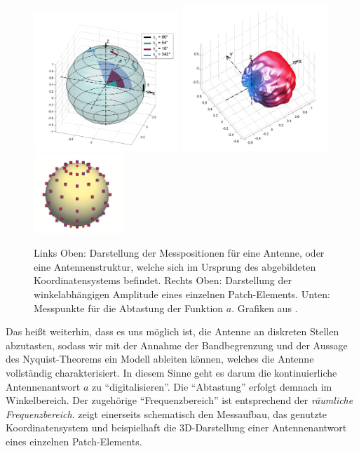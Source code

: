 \begin{figure}[t]
    \centering\includegraphics[width=0.49\textwidth]{img/eadf/measure.png}
    \includegraphics[width=0.49\textwidth]{img/eadf/3d_bp.png}
    \includegraphics[width=0.3\textwidth]{img/eadf/bp_sampling.png}
    \caption{Links Oben: Darstellung der Messpositionen f\"ur eine Antenne, oder eine Antennenstruktur, welche sich im Ursprung des abgebildeten Koordinatensystems befindet. Rechts Oben: Darstellung der winkelabh\"angigen Amplitude eines einzelnen Patch-Elements. Unten: Messpunkte f\"ur die Abtastung der Funktion $a$. Grafiken aus \cite{landmann2004EADF,delgaldo2007phd}.}\label{eadf_meas}
\end{figure}

Das hei{\ss}t weiterhin, dass es uns m\"oglich ist, die Antenne an diskreten Stellen abzutasten, sodass wir mit der Annahme der Bandbegrenzung und der Aussage des Nyquist-Theorems ein Modell ableiten k\"onnen, welches die Antenne vollst\"andig charakterisiert. In diesem Sinne geht es darum die kontinuierliche Antennenantwort $a$ zu ``digitalisieren''. Die ``Abtastung'' erfolgt demnach im Winkelbereich. Der zugeh\"orige ``Frequenzbereich'' ist entsprechend der \emph{r\"aumliche Frequenzbereich}.  zeigt einerseits schematisch den Messaufbau, das genutzte Koordinatensystem und beispielhaft die 3D-Darstellung einer Antennenantwort eines einzelnen Patch-Elements.

